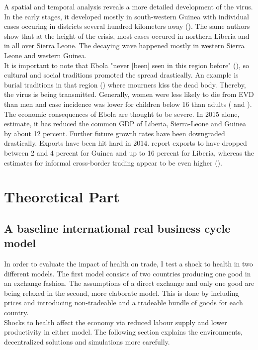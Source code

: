 \documentclass{article}
\begin{document}
A spatial and temporal analysis reveals a more detailed development of the virus. In the early stages, it developed mostly in south-western Guinea with individual cases occuring in districts several hundred kilometers away (\cite{ord2018retrospective}). The same authors show that at the height of the crisis, most cases occured in northern Liberia and in all over Sierra Leone. The decaying wave happened mostly in western Sierra Leone and western Guinea.\\
It is important to note that Ebola "never [been] seen in this region before" (\cite{frontieres2015pushed}), so cultural and social traditions promoted the spread drastically. An example is burial traditions in that region (\cite{who2014ebola}) where mourners kiss the dead body. Thereby, the virus is being transmitted. Generally, women were less likely to die from EVD than men and case incidence was lower for children below 16 than adults (\cite{who2016ebola} and \cite{who2015ebola}). \\
The economic consequences of Ebola are thought to be severe. In 2015 alone, \cite{thomas2015economic} estimate, it has reduced the common GDP of Liberia, Sierra-Leone and Guinea by about 12 percent. Further future growth rates have been downgraded drastically. Exports have been hit hard in 2014. \cite{africa2015socio} report exports to have dropped between 2 and 4 percent for Guinea and up to 16 percent for Liberia, whereas the estimates for informal cross-border trading appear to be even higher (\cite{africa2015socio}).

\section{Theoretical Part}

\subsection{A baseline international real business cycle model}

In order to evaluate the impact of health on trade, I test a shock to health in two different models. The first model consists of two countries producing one good in an exchange fashion. The assumptions of a direct exchange and only one good are being relaxed in the second, more elaborate model. This is done by including prices and introducing non-tradeable and a tradeable bundle of goods for each country. \\
Shocks to health affect the economy via reduced labour supply and lower productivity in either model. The following section explains the environments, decentralized solutions and simulations more carefully.
\end{document}
